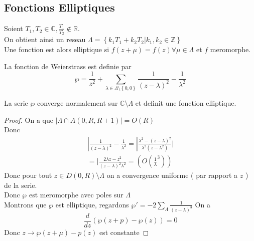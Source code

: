 \documentclass[../main.tex]{subfiles}
\begin{document}
\subsection{Fonctions Elliptiques}
Soient $T_1,T_2\in \mathbb{C}, \frac{T_1}{T_2}\notin \mathbb{R}$.\\
On obtient ainsi un reseau $ \Lambda = \left\{ k_1T_1+ k_2T_2| k_1,k_2\in \mathbb{Z} \right\} $ \\
Une fonction est alors elliptique si $f( z+\mu) = f( z) \forall \mu\in \Lambda $ et $f$ meromorphe.
\begin{defn}
	La fonction de Weierstrass est definie par
	\[ 
	\wp = \frac{1}{z^{2}}+\sum_{\lambda \in \Lambda\setminus \left\{ 0,0 \right\} }^{ } \frac{1}{( z-\lambda)^{2}} - \frac{1}{\lambda^{2}}
	\]
	
\end{defn}

\begin{propo}
La serie $\wp$ converge normalement sur $ \mathbb{C}\setminus \Lambda$ et definit une fonction elliptique.
\end{propo}
\begin{proof}
On a que $ |\Lambda \cap A( 0,R,R+1)| = O( R)  $ \\
Donc
\begin{align*}
|\frac{1}{( z-\lambda)^{2}}- \frac{1}{\lambda^{2}}= |\frac{\lambda^{2}- ( z-\lambda) ^{2}}{\lambda^{2}( z-\lambda^{2}) }|\\
= | \frac{2\lambda z -z ^{2}}{( z-\lambda)^{2}\lambda^{2}} = ( O( \frac 1 \lambda^3) ) 
\end{align*}
Donc pour tout $z\in D( 0,R)\setminus \Lambda $ on a convergence uniforme ( par rapport a $z$ ) de la serie.\\
Donc $\wp$ est meromorphe avec poles sur $ \Lambda$ \\
Montrons que $\wp$ est elliptique, regardons $\wp'= -2\sum_\Lambda  \frac{1}{( z-\lambda)^{3}}$ 
On a 
\[ 
\frac{d}{dz}( \wp( z+p) -\wp( z) ) = 0
\]
Donc $z\to \wp( z+\mu) -p( z) $ est constante	
\end{proof}
\end{document}

